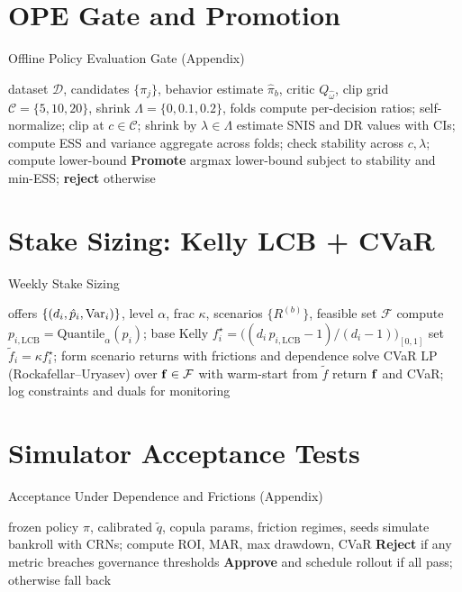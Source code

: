 \section{OPE Gate and Promotion}
\begin{algorithm}[H]\small
  \caption{Offline Policy Evaluation Gate (Appendix)}
  \label{alg:ope-gate-appendix}
  \begin{algorithmic}[1]
    \Require dataset $\mathcal D$, candidates $\{\pi_j\}$, behavior estimate $\hat\pi_b$, critic $Q_{\hat\omega}$, clip grid $\mathcal C=\{5,10,20\}$, shrink $\Lambda=\{0,0.1,0.2\}$, folds
        \State compute per-decision ratios; self-normalize; clip at $c\in \mathcal C$; shrink by $\lambda\in\Lambda$
        \State estimate SNIS and DR values with CIs; compute ESS and variance
      \EndFor
      \State aggregate across folds; check stability across $c,\lambda$; compute lower-bound
    \EndFor
    \State \textbf{Promote} argmax lower-bound subject to stability and min-ESS; \textbf{reject} otherwise
  \end{algorithmic}
\end{algorithm}

\section{Stake Sizing: Kelly LCB + CVaR}
\begin{algorithm}[H]\small
  \caption{Weekly Stake Sizing}
  \label{alg:stake-sizing}
  \begin{algorithmic}[1]
    \Require offers $\{(d_i, \hat p_i, \mathrm{Var}_i)\}$, level $\alpha$, frac $\kappa$, scenarios $\{R^{(b)}\}$, feasible set $\mathcal F$
    \State compute $p_{i,\text{LCB}} = \text{Quantile}_{\alpha}(p_i)$; base Kelly $f_i^\star = \big((d_i\,p_{i,\text{LCB}}-1)/(d_i-1)\big)_{[0,1]}$
    \State set $\tilde f_i = \kappa f_i^\star$; form scenario returns with frictions and dependence
    \State solve CVaR LP (Rockafellar–Uryasev) over $\mathbf{f}\in\mathcal F$ with warm-start from $\tilde f$
    \State return $\mathbf{f}$ and CVaR; log constraints and duals for monitoring
  \end{algorithmic}
\end{algorithm}

\section{Simulator Acceptance Tests}
\begin{algorithm}[H]\small
  \caption{Acceptance Under Dependence and Frictions (Appendix)}
  \label{alg:sim-accept-appendix}
  \begin{algorithmic}[1]
    \Require frozen policy $\pi$, calibrated $\tilde q$, copula params, friction regimes, seeds
      \State simulate bankroll with CRNs; compute ROI, MAR, max drawdown, CVaR
      \State \textbf{Reject} if any metric breaches governance thresholds
    \EndFor
    \State \textbf{Approve} and schedule rollout if all pass; otherwise fall back
  \end{algorithmic}
\end{algorithm}

